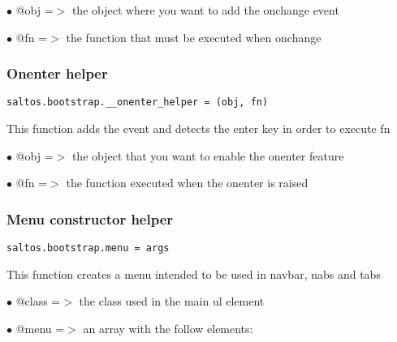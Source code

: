 \documentclass[a4paper]{article}
\begin{document}
\begin{compactitem}
\item[\color{myblue}$\bullet$] @obj   =$>$ the object where you want to add the onchange event
\item[\color{myblue}$\bullet$] @fn    =$>$ the function that must be executed when onchange
\end{compactitem}

\hypertarget{toc659}{}
\subsubsection{Onenter helper}

\begin{lstlisting}
saltos.bootstrap.__onenter_helper = (obj, fn)
\end{lstlisting}

This function adds the event and detects the enter key in order to execute fn

\begin{compactitem}
\item[\color{myblue}$\bullet$] @obj =$>$ the object that you want to enable the onenter feature
\item[\color{myblue}$\bullet$] @fn  =$>$ the function executed when the onenter is raised
\end{compactitem}

\hypertarget{toc660}{}
\subsubsection{Menu constructor helper}

\begin{lstlisting}
saltos.bootstrap.menu = args
\end{lstlisting}

This function creates a menu intended to be used in navbar, nabs and tabs

\begin{compactitem}
\item[\color{myblue}$\bullet$] @class =$>$ the class used in the main ul element
\item[\color{myblue}$\bullet$] @menu  =$>$ an array with the follow elements:
\end{compactitem}
\end{document}
